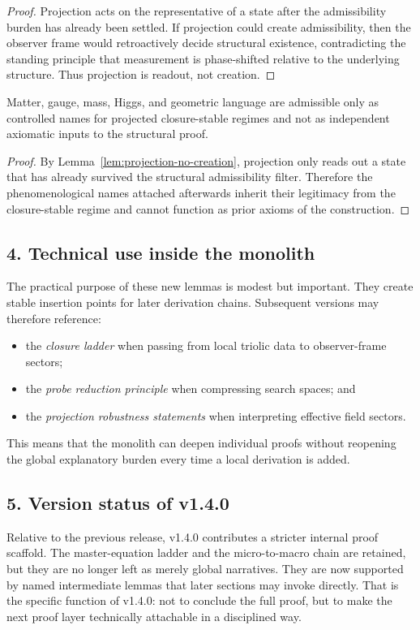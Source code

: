 \begin{proof}
Projection acts on the representative of a state after the admissibility burden
has already been settled. If projection could create admissibility, then the
observer frame would retroactively decide structural existence, contradicting
the standing principle that measurement is phase-shifted relative to the
underlying structure. Thus projection is readout, not creation.
\end{proof}

\begin{corollary}
\label{cor:interpretation-discipline}
Matter, gauge, mass, Higgs, and geometric language are admissible only as
controlled names for projected closure-stable regimes and not as independent
axiomatic inputs to the structural proof.
\end{corollary}

\begin{proof}
By Lemma~\ref{lem:projection-no-creation}, projection only reads out a state
that has already survived the structural admissibility filter. Therefore the
phenomenological names attached afterwards inherit their legitimacy from the
closure-stable regime and cannot function as prior axioms of the construction.
\end{proof}

\subsection*{4. Technical use inside the monolith}
The practical purpose of these new lemmas is modest but important. They create
stable insertion points for later derivation chains. Subsequent versions may
therefore reference:
\begin{itemize}[leftmargin=2em]
  \item the \emph{closure ladder} when passing from local triolic data to
  observer-frame sectors;
  \item the \emph{probe reduction principle} when compressing search spaces; and
  \item the \emph{projection robustness statements} when interpreting effective
  field sectors.
\end{itemize}
This means that the monolith can deepen individual proofs without reopening the
global explanatory burden every time a local derivation is added.

\subsection*{5. Version status of v1.4.0}
Relative to the previous release, v1.4.0 contributes a stricter internal
proof scaffold. The master-equation ladder and the micro-to-macro chain are
retained, but they are no longer left as merely global narratives. They are now
supported by named intermediate lemmas that later sections may invoke directly.
That is the specific function of v1.4.0: not to conclude the full proof,
but to make the next proof layer technically attachable in a disciplined way.


